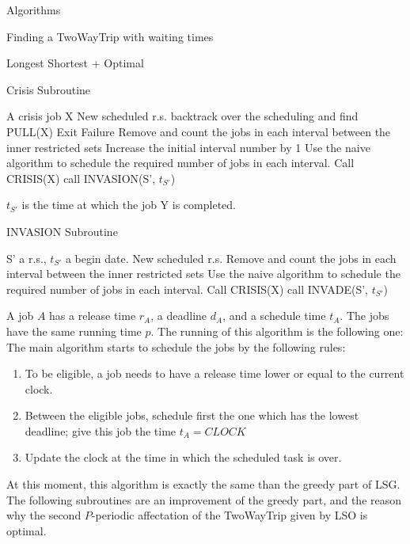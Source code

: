 \documentclass[a4paper,10pt]{report}
\begin{document}
\begin{chapter}{Algorithms}
\begin{section}{Finding a TwoWayTrip with waiting times}
\begin{subsection}{Longest Shortest + Optimal}
 \begin{algorithm}[H]
\caption{Crisis Subroutine}
\begin{algorithmic}
\REQUIRE A crisis job X
\ENSURE New scheduled r.s.
\STATE backtrack over the scheduling and find PULL(X)
\STATE Exit Failure
\ENDIF 
\STATE Remove and count the jobs in each interval between the inner restricted sets
\STATE Increase the initial interval number by 1
\STATE Use the naive algorithm to schedule the required number of jobs in each interval.
\STATE Call CRISIS(X)
\ELSE
{}
\STATE call INVASION(S', $t_{S'}$)
\ENDIF
\ENDIF
\ENDWHILE

\end{algorithmic}
\end{algorithm}
$t_{S'}$ is the time at which the job Y is completed.


 \begin{algorithm}[H]
\caption{INVASION Subroutine}
\begin{algorithmic}
\REQUIRE S' a r.s., $t_{S'}$ a begin date.
\ENSURE New scheduled r.s.
\STATE Remove and count the jobs in each interval between the inner restricted sets
\STATE Use the naive algorithm to schedule the required number of jobs in each interval.
\STATE Call CRISIS(X)
\ELSE
{}
\STATE call INVADE(S', $t_{S'}$)
\ENDIF
\ENDIF
\ENDWHILE

\end{algorithmic}
\end{algorithm}


A job $A$ has a release time $r_A$, a deadline $d_A$, and a schedule time $t_A$. The jobs have the same running time $p$.
The running of this algorithm is the following one:
The main algorithm starts to schedule the jobs by the following rules:

\begin{enumerate}
 \item To be eligible, a job needs to have a release time lower or equal to the current clock.
 \item Between the eligible jobs, schedule first the one which has the lowest deadline; give this job the time $t_A = CLOCK$
 \item Update the clock at the time in which the scheduled task is over.
\end{enumerate}
At this moment, this algorithm is exactly the same than the greedy part of LSG. The following subroutines are an improvement of the greedy part, and the reason why the second $P$-periodic affectation of the TwoWayTrip given by LSO is optimal.\\



\end{subsection}
\end{section}
\end{chapter}
\end{document}
